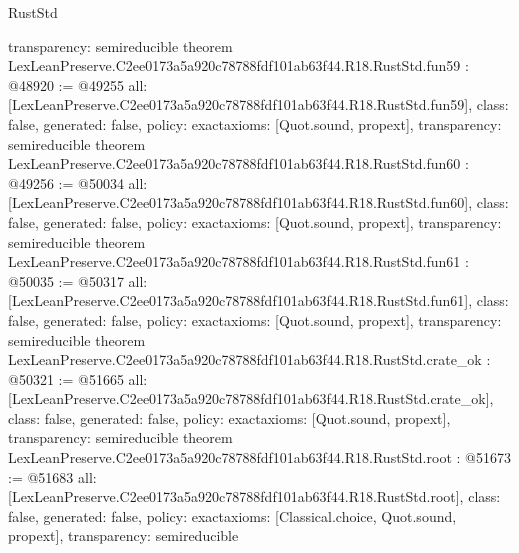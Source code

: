 \begin{lexlean}{RustStd}
\begin{coremodule}
{  transparency: semireducible
}
theorem LexLeanPreserve.C2ee0173a5a920c78788fdf101ab63f44.R18.RustStd.fun59 : @48920 := @49255 {
  all: [LexLeanPreserve.C2ee0173a5a920c78788fdf101ab63f44.R18.RustStd.fun59],
  class: false,
  generated: false,
  policy: exact{axioms: [Quot.sound, propext]},
  transparency: semireducible
}
theorem LexLeanPreserve.C2ee0173a5a920c78788fdf101ab63f44.R18.RustStd.fun60 : @49256 := @50034 {
  all: [LexLeanPreserve.C2ee0173a5a920c78788fdf101ab63f44.R18.RustStd.fun60],
  class: false,
  generated: false,
  policy: exact{axioms: [Quot.sound, propext]},
  transparency: semireducible
}
theorem LexLeanPreserve.C2ee0173a5a920c78788fdf101ab63f44.R18.RustStd.fun61 : @50035 := @50317 {
  all: [LexLeanPreserve.C2ee0173a5a920c78788fdf101ab63f44.R18.RustStd.fun61],
  class: false,
  generated: false,
  policy: exact{axioms: [Quot.sound, propext]},
  transparency: semireducible
}
theorem LexLeanPreserve.C2ee0173a5a920c78788fdf101ab63f44.R18.RustStd.crate_ok : @50321 := @51665 {
  all: [LexLeanPreserve.C2ee0173a5a920c78788fdf101ab63f44.R18.RustStd.crate_ok],
  class: false,
  generated: false,
  policy: exact{axioms: [Quot.sound, propext]},
  transparency: semireducible
}
theorem LexLeanPreserve.C2ee0173a5a920c78788fdf101ab63f44.R18.RustStd.root : @51673 := @51683 {
  all: [LexLeanPreserve.C2ee0173a5a920c78788fdf101ab63f44.R18.RustStd.root],
  class: false,
  generated: false,
  policy: exact{axioms: [Classical.choice, Quot.sound, propext]},
  transparency: semireducible
}


\end{coremodule}
\end{lexlean}
